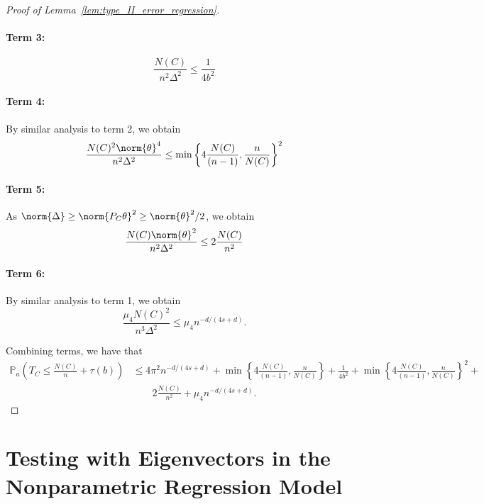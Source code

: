 \documentclass{article}
\newcommand{\set}[1]{\left\{#1\right\}}
\newcommand{\1}{\mathbb{I}}
\newcommand{\Pbb}{\mathbb{P}}
\theoremstyle{alden}
\theoremstyle{aldenthm}
\theoremstyle{definition}
\theoremstyle{remark}
\begin{document}
\begin{proof}[Proof of Lemma~\ref{lem:type_II_error_regression}]
\paragraph{Term 3:}
\begin{equation*}
\frac{N(C)}{n^2 \Delta^2} \leq \frac{1}{4b^2}
\end{equation*}

\paragraph{Term 4:}
By similar analysis to term 2, we obtain
\begin{equation*}
\frac{N(C)^2 \norm{\theta}^4}{n^2 \Delta^2} \leq \min \set{ 4 \frac{N(C)}{(n - 1)} , \frac{n}{N(C)} }^2
\end{equation*}

\paragraph{Term 5:}
As $\norm{\Delta} \geq \norm{P_C\theta}^2 \geq \norm{\theta}^2/2$, we obtain
\begin{equation*}
\frac{N(C) \norm{\theta}^2}{n^2 \Delta^2} \leq 2 \frac{N(C)}{n^2}
\end{equation*}

\paragraph{Term 6:}
By similar analysis to term 1, we obtain
\begin{equation*}
\frac{\mu_4N(C)^2}{n^3\Delta^2} \leq \mu_4n^{-d/(4s + d)}.
\end{equation*}

Combining terms, we have that 
\begin{align*}
\Pbb_a\left(T_C \leq \frac{N(C)}{n} + \tau(b) \right) & \leq 4\pi^2n^{-d/(4s+d)} + \min \set{ 4 \frac{N(C)}{(n - 1)} , \frac{n}{N(C)} } + \frac{1}{4b^2} + \min \set{ 4 \frac{N(C)}{(n - 1)} , \frac{n}{N(C)} }^2 + \\ 
& \quad \quad 2 \frac{N(C)}{n^2} + \mu_4n^{-d/(4s + d)}.
\end{align*}
\end{proof}

\section{Testing with Eigenvectors in the Nonparametric Regression Model}
\end{document}
